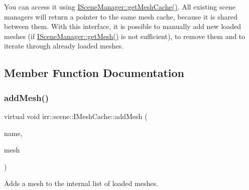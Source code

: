 You can access it using \hyperlink{classirr_1_1scene_1_1ISceneManager_a45d89c816e33abe0e77eb063d7ce58a8}{I\+Scene\+Manager\+::get\+Mesh\+Cache()}. All existing scene managers will return a pointer to the same mesh cache, because it is shared between them. With this interface, it is possible to manually add new loaded meshes (if \hyperlink{classirr_1_1scene_1_1ISceneManager_a63894c3f3d46cfc385116f1705935e03}{I\+Scene\+Manager\+::get\+Mesh()} is not sufficient), to remove them and to iterate through already loaded meshes. 

\subsection{Member Function Documentation}
\mbox{\label{classirr_1_1scene_1_1IMeshCache_a2959812a3a393817b1db42761766c49b}} 
\subsubsection{\texorpdfstring{add\+Mesh()}{addMesh()}}
{\footnotesize\ttfamily virtual void irr\+::scene\+::\+I\+Mesh\+Cache\+::add\+Mesh (\begin{DoxyParamCaption}\item[{const \hyperlink{namespaceirr_1_1io_ab1bdc45edb3f94d8319c02bc0f840ee1}{io\+::path} \&}]{name,  }\item[{\hyperlink{classirr_1_1scene_1_1IAnimatedMesh}{I\+Animated\+Mesh} $\ast$}]{mesh }\end{DoxyParamCaption})\hspace{0.3cm}{\ttfamily [pure virtual]}}



Adds a mesh to the internal list of loaded meshes. 

